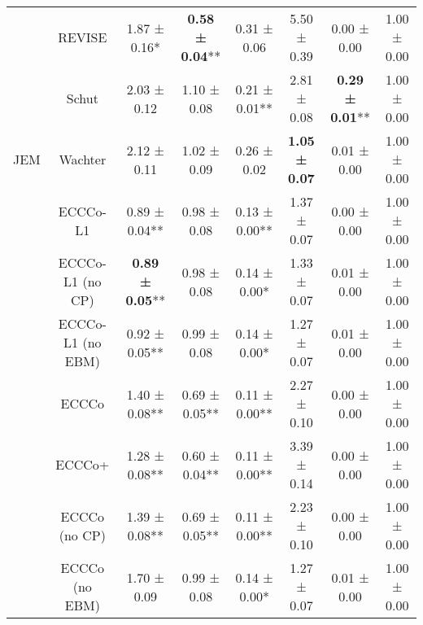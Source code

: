 \begin{table}
{\begin{tabular}[t]{cccccccc}
 & REVISE & 1.87 ± 0.16*\hphantom{*} & \textbf{0.58 ± 0.04}** & 0.31 ± 0.06\hphantom{*}\hphantom{*} & 5.50 ± 0.39\hphantom{*}\hphantom{*} & 0.00 ± 0.00\hphantom{*}\hphantom{*} & 1.00 ± 0.00\hphantom{*}\hphantom{*}\\

 & Schut & 2.03 ± 0.12\hphantom{*}\hphantom{*} & 1.10 ± 0.08\hphantom{*}\hphantom{*} & 0.21 ± 0.01** & 2.81 ± 0.08\hphantom{*}\hphantom{*} & \textbf{0.29 ± 0.01}** & 1.00 ± 0.00\hphantom{*}\hphantom{*}\\

\multirow[t]{-10}{*}{\centering\arraybackslash JEM} & Wachter & 2.12 ± 0.11\hphantom{*}\hphantom{*} & 1.02 ± 0.09\hphantom{*}\hphantom{*} & 0.26 ± 0.02\hphantom{*}\hphantom{*} & \textbf{1.05 ± 0.07}\hphantom{*}\hphantom{*} & 0.01 ± 0.00\hphantom{*}\hphantom{*} & 1.00 ± 0.00\hphantom{*}\hphantom{*}\\
\cmidrule{1-8}
 & ECCCo-L1 & 0.89 ± 0.04** & 0.98 ± 0.08\hphantom{*}\hphantom{*} & 0.13 ± 0.00** & 1.37 ± 0.07\hphantom{*}\hphantom{*} & 0.00 ± 0.00\hphantom{*}\hphantom{*} & 1.00 ± 0.00\hphantom{*}\hphantom{*}\\

 & ECCCo-L1 (no CP) & \textbf{0.89 ± 0.05}** & 0.98 ± 0.08\hphantom{*}\hphantom{*} & 0.14 ± 0.00*\hphantom{*} & 1.33 ± 0.07\hphantom{*}\hphantom{*} & 0.01 ± 0.00\hphantom{*}\hphantom{*} & 1.00 ± 0.00\hphantom{*}\hphantom{*}\\

 & ECCCo-L1 (no EBM) & 0.92 ± 0.05** & 0.99 ± 0.08\hphantom{*}\hphantom{*} & 0.14 ± 0.00*\hphantom{*} & 1.27 ± 0.07\hphantom{*}\hphantom{*} & 0.01 ± 0.00\hphantom{*}\hphantom{*} & 1.00 ± 0.00\hphantom{*}\hphantom{*}\\

 & ECCCo & 1.40 ± 0.08** & 0.69 ± 0.05** & 0.11 ± 0.00** & 2.27 ± 0.10\hphantom{*}\hphantom{*} & 0.00 ± 0.00\hphantom{*}\hphantom{*} & 1.00 ± 0.00\hphantom{*}\hphantom{*}\\

 & ECCCo+ & 1.28 ± 0.08** & 0.60 ± 0.04** & 0.11 ± 0.00** & 3.39 ± 0.14\hphantom{*}\hphantom{*} & 0.00 ± 0.00\hphantom{*}\hphantom{*} & 1.00 ± 0.00\hphantom{*}\hphantom{*}\\

 & ECCCo (no CP) & 1.39 ± 0.08** & 0.69 ± 0.05** & 0.11 ± 0.00** & 2.23 ± 0.10\hphantom{*}\hphantom{*} & 0.00 ± 0.00\hphantom{*}\hphantom{*} & 1.00 ± 0.00\hphantom{*}\hphantom{*}\\

 & ECCCo (no EBM) & 1.70 ± 0.09\hphantom{*}\hphantom{*} & 0.99 ± 0.08\hphantom{*}\hphantom{*} & 0.14 ± 0.00*\hphantom{*} & 1.27 ± 0.07\hphantom{*}\hphantom{*} & 0.01 ± 0.00\hphantom{*}\hphantom{*} & 1.00 ± 0.00\hphantom{*}\hphantom{*}\\


\end{tabular}}
\end{table}
